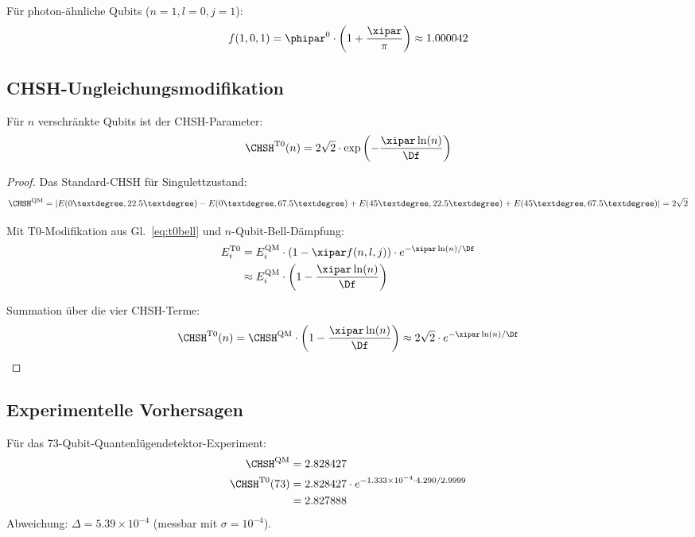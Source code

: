 Für photon-ähnliche Qubits ($n=1, l=0, j=1$):
\begin{equation}
	f(1,0,1) = \phipar^0 \cdot \left(1 + \frac{\xipar}{\pi}\right) \approx 1.000042
\end{equation}

\subsection{CHSH-Ungleichungsmodifikation}

\begin{proposition}
	Für $n$ verschränkte Qubits ist der CHSH-Parameter:
	\begin{equation}
		\CHSH^{\text{T0}}(n) = 2\sqrt{2} \cdot \exp\left(-\frac{\xipar \ln(n)}{\Df}\right)
		\label{eq:chsh_t0}
	\end{equation}
\end{proposition}

\begin{proof}
	Das Standard-CHSH für Singulettzustand:
	\begin{equation}
		\CHSH^{\text{QM}} = |E(0°, 22.5°) - E(0°, 67.5°) + E(45°, 22.5°) + E(45°, 67.5°)| = 2\sqrt{2}
	\end{equation}
	
	Mit T0-Modifikation aus Gl.~\eqref{eq:t0bell} und $n$-Qubit-Bell-Dämpfung:
	\begin{align}
		E^{\text{T0}}_i &= E^{\text{QM}}_i \cdot \left(1 - \xipar f(n,l,j)\right) \cdot e^{-\xipar\ln(n)/\Df} \\
		&\approx E^{\text{QM}}_i \cdot \left(1 - \frac{\xipar \ln(n)}{\Df}\right)
	\end{align}
	
	Summation über die vier CHSH-Terme:
	\begin{equation}
		\CHSH^{\text{T0}}(n) = \CHSH^{\text{QM}} \cdot \left(1 - \frac{\xipar \ln(n)}{\Df}\right) \approx 2\sqrt{2} \cdot e^{-\xipar\ln(n)/\Df}
	\end{equation}
\end{proof}

\subsection{Experimentelle Vorhersagen}
\label{sec:experiments}
\begin{experimentbox}
	Für das 73-Qubit-Quantenlügendetektor-Experiment:
	\begin{align}
		\CHSH^{\text{QM}} &= 2.828427 \\
		\CHSH^{\text{T0}}(73) &= 2.828427 \cdot e^{-1.333 \times 10^{-4} \cdot 4.290/2.9999} \\
		&= 2.827888
	\end{align}
	Abweichung: $\Delta = 5.39 \times 10^{-4}$ (messbar mit $\sigma = 10^{-4}$).
\end{experimentbox}


